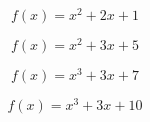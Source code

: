 \documentclass{jarticle}
\begin{document}
  \begin{equation}
    f(x) = x^2 + 2x + 1
  \end{equation}

  \begin{equation}
    f(x) = x^2 + 3x + 5
  \end{equation}

  \begin{equation}
    f(x) = x^3 + 3x + 7
  \end{equation}

  \begin{equation}
    f(x) = x^3 + 3x + 10
  \end{equation}
\end{document}
